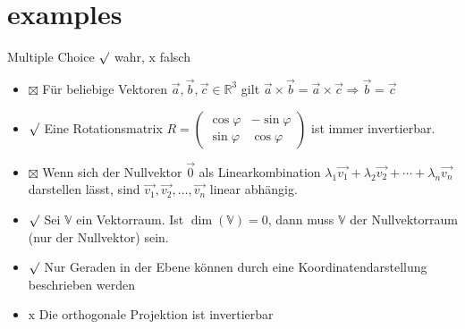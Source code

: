 \section{examples}

\begin{example2}{Multiple Choice} $\surd$ wahr, $\mathrm{x}$ falsch
    \begin{itemize}
        \item $\boxtimes$ Für beliebige Vektoren $\vec{a}, \vec{b}, \vec{c} \in \mathbb{R}^{3}$ gilt $\vec{a} \times \vec{b}=\vec{a} \times \vec{c} \Rightarrow \vec{b}=\vec{c}$
        \item $\surd$ Eine Rotationsmatrix $R=\left(\begin{array}{cc}\cos \varphi & -\sin \varphi \\ \sin \varphi & \cos \varphi\end{array}\right)$ ist immer invertierbar.
        \item $\boxtimes$ Wenn sich der Nullvektor $\overrightarrow{0}$ als Linearkombination $\lambda_{1} \overrightarrow{v_{1}}+\lambda_{2} \overrightarrow{v_{2}}+\cdots+\lambda_{n} \overrightarrow{v_{n}}$ darstellen lässt, sind $\overrightarrow{v_{1}}, \overrightarrow{v_{2}}, \ldots, \overrightarrow{v_{n}}$ linear abhängig.
        \item $\surd$ Sei $\mathbb{V}$ ein Vektorraum. Ist $\operatorname{dim}(\mathbb{V})=0$, dann muss $\mathbb{V}$ der Nullvektorraum (nur der Nullvektor) sein.
        \item $\surd$ Nur Geraden in der Ebene können durch eine Koordinatendarstellung beschrieben werden
        \item $\mathrm{x}$ Die orthogonale Projektion ist invertierbar
    \end{itemize}

    
\end{example2}

